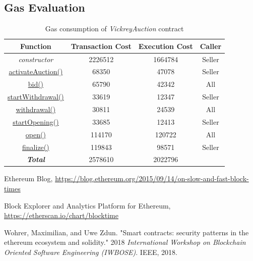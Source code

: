 \documentclass[runningheads,a4paper]{llncs}
\begin{document}
\subsection{Gas Evaluation}

\begin{table}
\setlength{\tabcolsep}{10pt}
\setlength{\abovecaptionskip}{10pt}
\centering
\begin{tabular}{| c | c | c | c |} 
 \hline
 \textbf{Function} & \textbf{Transaction Cost} & \textbf{Execution Cost} & \textbf{Caller} \\
 \hline
 \emph{constructor} & 2226512 & 1664784 & Seller \\ 
 \hline
 \url{activateAuction()} & 68350 & 47078 & Seller \\ 
 \hline
 \url{bid()} & 65790 & 42342 & All \\ 
 \hline
 \url{startWithdrawal()} & 33619 & 12347 & Seller \\
 \hline
 \url{withdrawal()} & 30811 & 24539 & All \\
 \hline
 \url{startOpening()} & 33685 & 12413 & Seller \\
 \hline
 \url{open()} & 114170 & 120722 & All \\
 \hline
 \url{finalize()} & 119843 & 98571 & Seller \\
 \hline
 \hline
 \hline
 \textbf{\emph{Total}} & 2578610 & 2022796 & \\ \hline
\end{tabular}
\caption{Gas consumption of \emph{VickreyAuction} contract}
\label{table:2}
\end{table}


\newpage
\begin{thebibliography}{4}

 Ethereum Blog, 
\url{https://blog.ethereum.org/2015/09/14/on-slow-and-fast-block-times}

 Block Explorer and Analytics Platform for Ethereum, 
\url{https://etherscan.io/chart/blocktime}

Wohrer, Maximilian, and Uwe Zdun. "Smart contracts: security patterns in the ethereum ecosystem and solidity." 2018 \emph{International Workshop on Blockchain Oriented Software Engineering (IWBOSE)}. IEEE, 2018.


\end{thebibliography}
\end{document}
